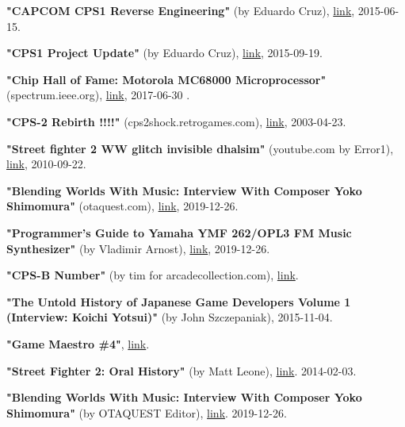 \begin{thebibliography}{999}
  \textbf{"CAPCOM CPS1 Reverse Engineering"} (by Eduardo Cruz),
  \href{https://www.youtube.com/watch?v=IBZc__9sM28}{link},
  2015-06-15.

  \textbf{"CPS1 Project Update"} (by Eduardo Cruz),
  \href{http://arcadehacker.blogspot.com/2015/09/project-update.html}{link},
  2015-09-19.

  \textbf{"Chip Hall of Fame: Motorola MC68000 Microprocessor"} (spectrum.ieee.org),
  \href{https://spectrum.ieee.org/tech-history/silicon-revolution/chip-hall-of-fame-motorola-mc68000-microprocessor}{link},
  2017-06-30
  .

  \textbf{"CPS-2 Rebirth !!!!"} (cps2shock.retrogames.com),
  \href{https://web.archive.org/web/20060812042251/http://cps2shock.retrogames.com/wip.html}{link},
  2003-04-23.

  \textbf{"Street fighter 2 WW glitch invisible dhalsim"} (youtube.com by Error1),
  \href{https://www.youtube.com/watch?v=qEFPzcOK_uQ}{link},
  2010-09-22.

  \textbf{"Blending Worlds With Music: Interview With Composer Yoko Shimomura"} (otaquest.com),
  \href{https://www.otaquest.com/yoko-shimomura-interview/}{link},
  2019-12-26.

  \textbf{"Programmer's Guide to Yamaha YMF 262/OPL3 FM Music Synthesizer"} (by Vladimir Arnost),
  \href{https://www.fit.vutbr.cz/~arnost/opl/opl3.html}{link},
  2019-12-26.

  \textbf{"CPS-B Number"} (by tim for arcadecollection.com),
  \href{http://www.arcadecollecting.com/info/cps-b_numbers.html}{link}.

  
  \textbf{"The Untold History of Japanese Game Developers Volume 1 (Interview: Koichi Yotsui)"} (by John Szczepaniak),
  2015-11-04.

  \textbf{"Game Maestro \#4"}, \href{http://shmuplations.com/akiman/}{link}.

  \textbf{"Street Fighter 2: Oral History"} (by Matt Leone),
  \href{https://www.polygon.com/a/street-fighter-2-oral-history/}{link}.
  2014-02-03.

  \textbf{"Blending Worlds With Music: Interview With Composer Yoko Shimomura"} (by OTAQUEST Editor),
  \href{https://www.otaquest.com/yoko-shimomura-interview/}{link}.
  2019-12-26.
  

\end{thebibliography}
